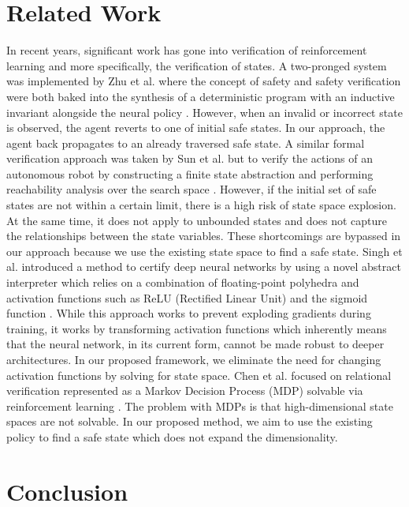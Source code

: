 \documentclass[acmsmall,review,authorversion]{acmart}
\begin{document}
\section{Related Work}
\label{section:related_work}

In recent years, significant work has gone into verification of reinforcement learning and more specifically, the verification of states. A two-pronged system was implemented by Zhu et al. where the concept of safety and safety verification were both baked into the synthesis of a deterministic program with an inductive invariant alongside the neural policy \cite{zhu:2019}. However, when an invalid or incorrect state is observed, the agent reverts to one of initial safe states. In our approach, the agent back propagates to an already traversed safe state.
A similar formal verification approach was taken by Sun et al.  but to verify the actions of an autonomous robot by constructing a finite state abstraction and performing reachability analysis over the search space \cite{sun:2019}. However, if the initial set of safe states are not within a certain limit, there is a high risk of state space explosion. At the same time, it does not apply to unbounded states and does not capture the relationships between the state variables. These shortcomings are bypassed in our approach because we use the existing state space to find a safe state. Singh et al. introduced a method to certify deep neural networks by using a novel abstract interpreter which relies on a combination of floating-point polyhedra and activation functions such as ReLU (Rectified Linear Unit) and the sigmoid function \cite{singh:2019}. While this approach works to prevent exploding gradients during training, it works by transforming activation functions which inherently means that the neural network, in its current form, cannot be made robust to deeper architectures. In our proposed framework, we eliminate the need for changing activation functions by solving for state space. Chen et al. focused on relational verification represented as a Markov Decision Process (MDP) solvable via reinforcement learning \cite{chen:2019}. The problem with MDPs is that high-dimensional state spaces are not solvable. In our proposed method, we aim to use the existing policy to find a safe state which does not expand the dimensionality.



\section{Conclusion}
\label{section:conclusion}
\end{document}
